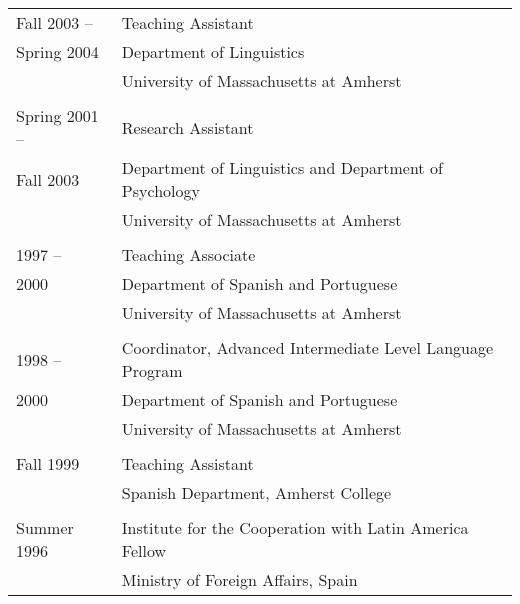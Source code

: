 \documentclass[11pt]{article}
\begin{document}
\begin{tabular}{p{2.815cm}p{280pt}}
Fall 2003 -- & Teaching Assistant\\
 Spring 2004&  Department of
Linguistics\\
& University of Massachusetts at Amherst\\ 
& \\[-9pt]
Spring 2001 -- & Research Assistant\\
 Fall 2003 &  Department of Linguistics and Department of Psychology\\
&  University of Massachusetts at Amherst\\
 & \\[-8pt]
1997 --&  Teaching Associate\\
 2000 &  Department of Spanish and Portuguese\\
&  University of Massachusetts at Amherst\\
&  \\[-8pt]
 1998 -- & Coordinator, Advanced Intermediate Level
 Language  Program\\
 2000& Department of Spanish and Portuguese \\
 &  University of Massachusetts at Amherst\\
 &  \\[-8pt]
Fall 1999 & Teaching Assistant\\
 & Spanish Department, Amherst
College\\
 & \\[-8pt]
Summer 1996  & Institute for the Cooperation with Latin America
Fellow\\
 & Ministry of Foreign Affairs, Spain\\
\end{tabular}
\end{document}
